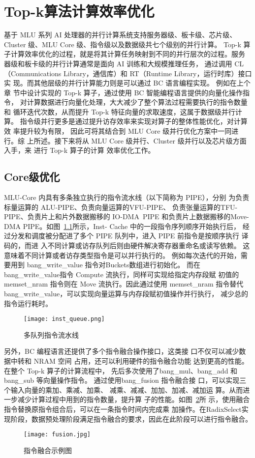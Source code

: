 \section{Top-k算法计算效率优化}
基于 MLU 系列 AI 处理器的并行计算系统支持服务器级、板卡级、芯片级、Cluster 级、MLU Core 级、指令级以及数据级共七个级别的并行计算。
Top-k 算 子计算效率优化的过程，就是将其计算任务映射到不同的并行层次的过程。服务 器级和板卡级的并行计算通常是面向 AI 训练和大规模推理任务，
通过调用 CL（Communications Library，通信库）和 RT（Runtime Library，运行时库）接口实 现。而其他层级的并行计算能力则是可以通过 BC 语言编程实现。
例如在上个章 节中设计实现的 Top-k 算子，通过使用 BC 智能编程语言提供的向量化操作指令， 对计算数据进行向量化处理，大大减少了整个算法过程需要执行的指令数量和
 循环迭代次数，从而提升 Top-k 特征向量的求取速度，这属于数据级并行计算。 指令级并行更多是通过提升访存效率来实现对算子的整体性能优化，对计算效 率提升较为有限，
 因此可将其结合到 MLU Core 级并行优化方案中一同进行。综 上所述。接下来将从 MLU Core 级并行、Cluster 级并行以及芯片级方面入手，来 进行 Top-k 算子的计算
 效率优化工作。

\subsection{Core级优化}
MLU-Core 内具有多条独立执行的指令流水线（以下简称为 PIPE），分别 为负责标量运算的 ALU-PIPE、负责向量运算的VFU-PIPE、
负责张量运算的TFU-PIPE、负责片上和片外数据搬移的 IO-DMA\ PIPE 和负责片上数据搬移的Move-DMA PIPE。如图~\ref{}所示，Inst-
Cache 中的一段指令序列顺序开始执行后， 经过分发和调度被分配进了多个 PIPE 队列中，进入 PIPE 前指令是按顺序执行 译码的，而进
入不同计算或访存队列后则由硬件解决寄存器重命名或读写依赖。 这意味着不同计算或者访存类型指令是可以并行执行的。
例如每次迭代的开始，需要用到 bang\_write\_value 指令对Buckets数组进行初始化。
而在bang\_write\_value指令 Compute 流执行，同样可实现给指定内存段赋 初值的
 memset\_nram 指令则在 Move 流执行。因此通过使用 memset\_nram 指令替代
 bang\_write\_value，可以实现向量运算与内存段赋初值操作并行执行，
 减少总的指令运行耗时。
\begin{figure}[ht]
    \centering
    \texttt{[image: inst\_queue.png]}
    \caption{多队列指令流水线}
    \label{fig:inst_queue}
\end{figure}

另外，BC 编程语言还提供了多个指令融合操作接口，这类接 口不仅可以减少数据中转和 NRAM 空间
占用，还可以利用硬件的指令融合功能 达到更高的性能。在整个 Top-k 算子的计算流程中，
先后多次使用了bang\_mul、bang\_add 和 bang\_sub 等向量操作指令。
通过使用bang\_fusion 指令融合接 口，可以实现三个输入向量的乘加、乘减、加乘、
减乘、减减、加加、加减、减加运 算。从而进一步减少计算过程中用到的指令数量，提升算
子的性能。如图~\ref{fig:fusion}所 示，使用融合指令替换原指令组合后，可以在一条指令时间内完成乘
加操作。在RadixSelect实现阶段，数据预处理阶段满足指令融合的要求，因此在此阶段可以进行指令融合。
\begin{figure}[ht]
    \centering
    \texttt{[image: fusion.jpg]}
    \caption{指令融合示例图}
    \label{fig:fusion}
\end{figure}

